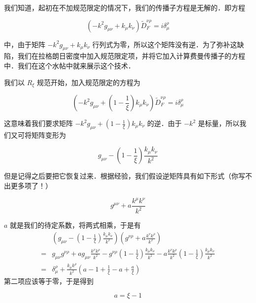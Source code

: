 
我们知道，起初在不加规范限定的情况下，我们的传播子方程是无解的．即方程

\begin{equation}
\left(-k^2 g_{\mu\nu}+k_\mu k_\nu\right)\tilde D^{\nu\rho}_F
=i\delta^\rho_\mu
\end{equation}

中，由于矩阵 $-k^2 g_{\mu\nu}+k_\mu k_\nu$ 行列式为零，所以这个矩阵没有逆．为了弥补这缺陷，我们在拉格朗日密度中加入规范限定项，并将它加入计算费曼传播子的方程中．我们在这个水帖中就来展示这个技术．

我们以 $R_\xi$ 规范开始，加入规范限定的方程为

\begin{equation}
\left(-k^2 g_{\mu\nu}+\left(1-\frac{1}{\xi}\right)k_\mu k_\nu\right)\tilde D^{\nu\rho}_F
=i\delta^\rho_\mu
\end{equation}

这意味着我们要求矩阵 $-k^2 g_{\mu\nu}+\left(1-\frac{1}{\xi}\right)k_\mu k_\nu$ 的逆．由于 $-k^2$ 是标量，所以我们又可将矩阵变形为

\begin{equation}
g_{\mu\nu}-\left(1-\frac{1}{\xi}\right)\frac{k_\mu k_\nu}{k^2}
\end{equation}

但是记得之后要把它恢复过来．根据经验，我们假设逆矩阵具有如下形式（你写不出更多项了！）

\begin{equation}
g^{\mu\nu}+a\frac{k^\mu k^\nu}{k^2}
\end{equation}

$a$ 就是我们的待定系数，将两式相乘，于是有
\begin{equation}
\begin{split}
&\left(g_{\mu\nu}-\left(1-\frac{1}{\xi}\right)\frac{k_\mu k_\nu}{k^2}\right)
\left(g^{\nu\rho}+a\frac{k^\nu k^\rho}{k^2}\right)\\
=&g_{\mu\nu}g^{\nu\rho}+
ag_{\mu\nu}\frac{k^\nu k^\rho}{k^2}-
g^{\nu\rho}\left(1-\frac{1}{\xi}\right)\frac{k_\mu k_\nu}{k^2}
-a\frac{k^\nu k^\rho}{k^2}\left(1-\frac{1}{\xi}\right)\frac{k_\mu k_\nu}{k^2}\\
=&\delta^\rho_\mu+\frac{k_\mu k^\rho}{k^2}
\left(
a-1+\frac{1}{\xi}-a+\frac{a}{\xi}
\right)
\end{split}
\end{equation}
第二项应该等于零，于是得到

\begin{equation}
a=\xi-1
\end{equation}

